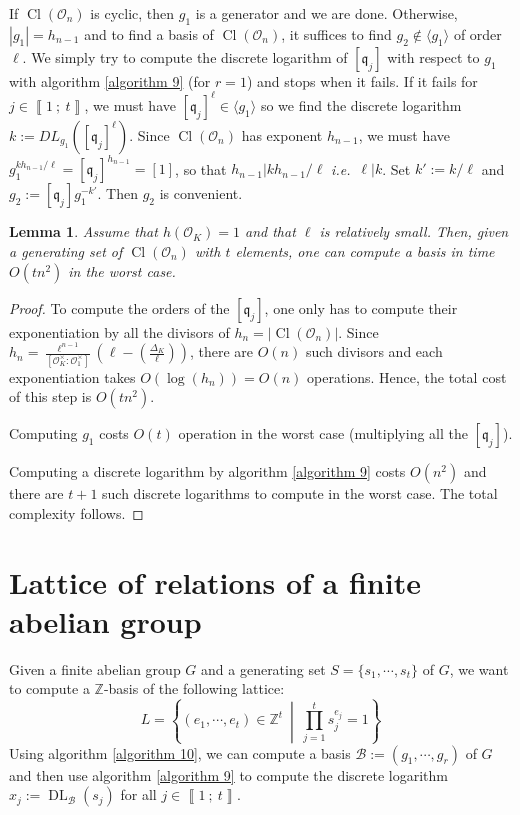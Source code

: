 \documentclass[a4paper,10pt]{report}
\theoremstyle{definition}
\theoremstyle{plain}
\newtheorem{lemma}[definition]{Lemma}
\theoremstyle{definition}
\newcommand{\ie}{\emph{i.e.}\ }
\newcommand{\Z}{\mathbb{Z}}
\newcommand{\m}[1]{\mathcal{#1}}
\newcommand{\mO}{\mathcal{O}}
\renewcommand{\i}[2]{\left\llbracket #1~;~#2\right\rrbracket}
\renewcommand{\(}{\left(}
\renewcommand{\)}{\right)}
\newcommand{\mf}[1]{\mathfrak{#1}}
\DeclareMathOperator{\Cl}{Cl}
\DeclareMathOperator{\DL}{DL}
\begin{document}
If $\Cl(\mO_n)$ is cyclic, then $g_1$ is a generator and we are done. Otherwise, $|g_1|=h_{n-1}$ and to find a basis of $\Cl(\mO_n)$, it suffices to find $g_2\not\in \langle g_1\rangle$ of order $\ell$. We simply try to compute the discrete logarithm of $[\mf{q}_j]$ with respect to $g_1$ with algorithm \ref{algorithm 9} (for $r=1$) and stops when it fails. If it fails for $j\in\i{1}{t}$, we must have $[\mf{q}_j]^\ell\in\langle g_1\rangle$ so we find the discrete logarithm $k:=DL_{g_1}([\mf{q}_j]^\ell)$. Since $\Cl(\mO_n)$ has exponent $h_{n-1}$, we must have $g_1^{kh_{n-1}/\ell}=[\mf{q}_j]^{h_{n-1}}=[1]$, so that $h_{n-1}|kh_{n-1}/\ell$ \ie $\ell|k$. Set $k':=k/\ell$ and $g_2:=[\mf{q}_j]g_1^{-k'}$. Then $g_2$ is convenient.

\begin{lemma}\label{lemma 19}
Assume that $h(\mO_K)=1$ and that $\ell$ is relatively small. Then, given a generating set of $\Cl(\mO_n)$ with $t$ elements, one can compute a basis in time $O(tn^2)$ in the worst case. 
\end{lemma}

\begin{proof}
To compute the orders of the $[\mf{q}_j]$, one only has to compute their exponentiation by all the divisors of $h_n=|\Cl(\mO_n)|$. Since $h_n=\frac{\ell^{n-1}}{[\mO_K^\times:\mO_1^\times]}\(\ell-\(\frac{\Delta_K}{\ell}\)\)$, there are $O(n)$ such divisors and each exponentiation takes $O(\log(h_n))=O(n)$ operations. Hence, the total cost of this step is $O(tn^2)$.

Computing $g_1$ costs $O(t)$ operation in the worst case (multiplying all the $[\mf{q}_j]$).

Computing a discrete logarithm by algorithm \ref{algorithm 9} costs $O(n^2)$ and there are $t+1$ such discrete logarithms to compute in the worst case. The total complexity follows.
\end{proof}

\section{Lattice of relations of a finite abelian group}

Given a finite abelian group $G$ and a generating set $S=\{s_1,\cdots, s_t\}$ of $G$, we want to compute a $\Z$-basis of the following lattice:
\[L=\left\{(e_1,\cdots,e_t)\in\Z^t \ \middle| \ \prod_{j=1}^t s_j^{e_j}=1\right\}\]
Using algorithm \ref{algorithm 10}, we can compute a basis $\m{B}:=(g_1,\cdots, g_r)$ of $G$ and then use algorithm \ref{algorithm 9} to compute the discrete logarithm $x_j:=\DL_{\m{B}}(s_j)$ for all $j\in\i{1}{t}$. 
\end{document}

